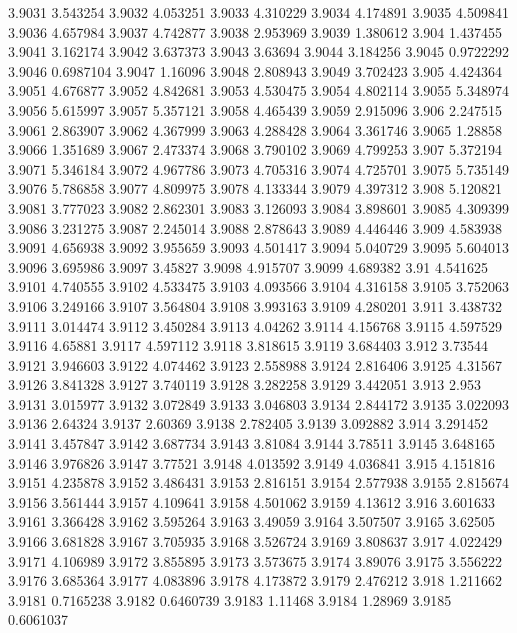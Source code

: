 3.9031  3.543254
3.9032  4.053251
3.9033  4.310229
3.9034  4.174891
3.9035  4.509841
3.9036  4.657984
3.9037  4.742877
3.9038  2.953969
3.9039  1.380612
3.904  1.437455
3.9041  3.162174
3.9042  3.637373
3.9043  3.63694
3.9044  3.184256
3.9045  0.9722292
3.9046  0.6987104
3.9047  1.16096
3.9048  2.808943
3.9049  3.702423
3.905  4.424364
3.9051  4.676877
3.9052  4.842681
3.9053  4.530475
3.9054  4.802114
3.9055  5.348974
3.9056  5.615997
3.9057  5.357121
3.9058  4.465439
3.9059  2.915096
3.906  2.247515
3.9061  2.863907
3.9062  4.367999
3.9063  4.288428
3.9064  3.361746
3.9065  1.28858
3.9066  1.351689
3.9067  2.473374
3.9068  3.790102
3.9069  4.799253
3.907  5.372194
3.9071  5.346184
3.9072  4.967786
3.9073  4.705316
3.9074  4.725701
3.9075  5.735149
3.9076  5.786858
3.9077  4.809975
3.9078  4.133344
3.9079  4.397312
3.908  5.120821
3.9081  3.777023
3.9082  2.862301
3.9083  3.126093
3.9084  3.898601
3.9085  4.309399
3.9086  3.231275
3.9087  2.245014
3.9088  2.878643
3.9089  4.446446
3.909  4.583938
3.9091  4.656938
3.9092  3.955659
3.9093  4.501417
3.9094  5.040729
3.9095  5.604013
3.9096  3.695986
3.9097  3.45827
3.9098  4.915707
3.9099  4.689382
3.91  4.541625
3.9101  4.740555
3.9102  4.533475
3.9103  4.093566
3.9104  4.316158
3.9105  3.752063
3.9106  3.249166
3.9107  3.564804
3.9108  3.993163
3.9109  4.280201
3.911  3.438732
3.9111  3.014474
3.9112  3.450284
3.9113  4.04262
3.9114  4.156768
3.9115  4.597529
3.9116  4.65881
3.9117  4.597112
3.9118  3.818615
3.9119  3.684403
3.912  3.73544
3.9121  3.946603
3.9122  4.074462
3.9123  2.558988
3.9124  2.816406
3.9125  4.31567
3.9126  3.841328
3.9127  3.740119
3.9128  3.282258
3.9129  3.442051
3.913  2.953
3.9131  3.015977
3.9132  3.072849
3.9133  3.046803
3.9134  2.844172
3.9135  3.022093
3.9136  2.64324
3.9137  2.60369
3.9138  2.782405
3.9139  3.092882
3.914  3.291452
3.9141  3.457847
3.9142  3.687734
3.9143  3.81084
3.9144  3.78511
3.9145  3.648165
3.9146  3.976826
3.9147  3.77521
3.9148  4.013592
3.9149  4.036841
3.915  4.151816
3.9151  4.235878
3.9152  3.486431
3.9153  2.816151
3.9154  2.577938
3.9155  2.815674
3.9156  3.561444
3.9157  4.109641
3.9158  4.501062
3.9159  4.13612
3.916  3.601633
3.9161  3.366428
3.9162  3.595264
3.9163  3.49059
3.9164  3.507507
3.9165  3.62505
3.9166  3.681828
3.9167  3.705935
3.9168  3.526724
3.9169  3.808637
3.917  4.022429
3.9171  4.106989
3.9172  3.855895
3.9173  3.573675
3.9174  3.89076
3.9175  3.556222
3.9176  3.685364
3.9177  4.083896
3.9178  4.173872
3.9179  2.476212
3.918  1.211662
3.9181  0.7165238
3.9182  0.6460739
3.9183  1.11468
3.9184  1.28969
3.9185  0.6061037
